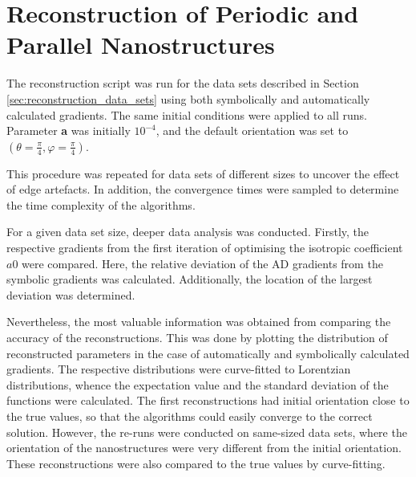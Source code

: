 

\section{Reconstruction of Periodic and Parallel Nanostructures}\label{sec:pp_nanostructures_reconstruction}


The reconstruction script was run for the data sets described in Section \ref{sec:reconstruction_data_sets} using both symbolically and automatically calculated gradients.
The same initial conditions were applied to all runs.
Parameter \textbf{a} was initially $10^{-4}$, and the default orientation was set to $\left( \theta = \frac{\pi}{4}, \varphi = \frac{\pi}{4} \right)$.

This procedure was repeated for data sets of different sizes to uncover the effect of edge artefacts.
In addition, the convergence times were sampled to determine the time complexity of the algorithms.

For a given data set size, deeper data analysis was conducted.
Firstly, the respective gradients from the first iteration of optimising the isotropic coefficient $a0$ were compared.
Here, the relative deviation of the AD gradients from the symbolic gradients was calculated.
Additionally, the location of the largest deviation was determined.

Nevertheless, the most valuable information was obtained from comparing the accuracy of the reconstructions.
This was done by plotting the distribution of reconstructed parameters in the case of automatically and symbolically calculated gradients.
The respective distributions were curve-fitted to Lorentzian distributions, whence the expectation value and the standard deviation of the functions were calculated.
The first reconstructions had initial orientation close to the true values, so that the algorithms could easily converge to the correct solution.
However, the re-runs were conducted on same-sized data sets, where the orientation of the nanostructures were very different from the initial orientation.
These reconstructions were also compared to the true values by curve-fitting.

